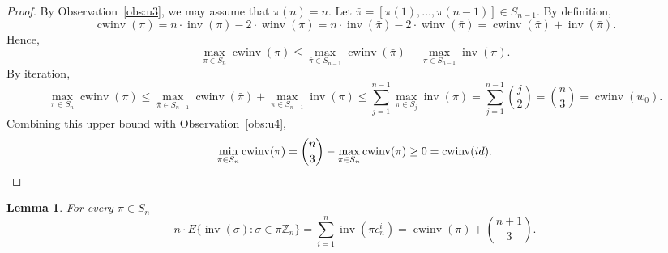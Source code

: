 \documentclass[11pt]{amsart}
\newtheorem{lemma}[theorem]{Lemma}
\numberwithin{equation}{section}
\newcommand{\ZZ}{{\mathbb {Z}}}
\newcommand{\inv}{{\operatorname{inv}}}
\newcommand{\winv}{{\operatorname{winv}}}
\newcommand{\cwinv}{{\operatorname{cwinv}}}
\begin{document}
\begin{proof}
    By Observation~\ref{obs:u3}, we may assume that $\pi(n)=n$.
    Let $\bar\pi=[\pi(1),\dots,\pi(n-1)]\in S_{n-1}$. By definition,
    \[
    \cwinv(\pi)=n\cdot \inv(\pi)-2\cdot \winv(\pi)=
    n\cdot \inv(\bar \pi)-2\cdot \winv(\bar \pi)=
    \cwinv(\bar \pi)+ \inv(\bar \pi).
    \]
Hence, 
\[
\max_{\pi\in S_n} \cwinv(\pi)\le \max_{\bar \pi\in S_{n-1}} \cwinv(\bar \pi)+\max_{\pi \in S_{n-1}}\inv(\pi). 
\]
By iteration, 
\[
    \max_{\pi\in S_n} \cwinv(\pi)
    \le \max_{\bar \pi\in S_{n-1}} \cwinv(\bar \pi)+\max_{\pi \in S_{n-1}}\inv(\pi)
    \le \sum_{j=1}^{n-1} \max_{\pi\in S_j} \inv(\pi)
    = \sum_{j=1}^{n-1}\binom{j}{2}
    = \binom{n}{3} 
    = \cwinv(w_0).
\]
Combining this upper bound with Observation~\ref{obs:u4}, 
\[
    \min_{\pi\in S_n} \cwinv(\pi)
    = \binom{n}{3}-\max_{\pi\in S_n}\cwinv(\pi)
    \ge 0 
    = \cwinv(id). \qedhere
\]
\end{proof}


\begin{lemma}\label{lem:u7}
    For every $\pi \in S_n$
    \[
        n\cdot  %
        E\{ \inv(\sigma): \sigma \in  \pi \ZZ_n\}
        = \sum_{i=1}^n \inv(\pi c_n^i)
        = \cwinv(\pi)+ \binom{n+1}{3}.
    \]
\end{lemma}
\end{document}
